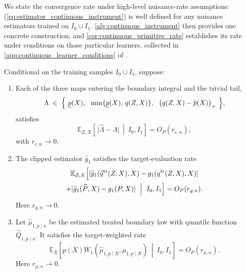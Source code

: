 We state the convergence rate under high-level nuisance-rate assumptions: (\ref{eq:estimator_continuous_instrument}) is well defined for any nuisance estimators trained on $I_0\cup I_1$. \cref{alg:continuous_instrument} then provides one concrete construction, and \cref{cor:continuous_primitive_rate} establishes its rate under conditions on those particular learners, collected in \cref{app:continuous_learner_conditions} of \oalocation.
\begin{assumption}\label{asp:continuous_rates}
    Conditional on the training samples $I_0\cup I_1$, suppose:
    \begin{enumerate}
        \item Each of the three maps entering the boundary integral and the trivial tail,
        \begin{equation*}
            \Lambda \;\in\; \Bigl\{\ \underline{p}(X),\ \ \min\{\underline{p}(X),\,q(Z,X)\},\ \ \bigl(q(Z,X)-\overline{p}(X)\bigr)_+ \ \Bigr\},
        \end{equation*}
        satisfies
        \[
            \mathbb E_{Z,X}\!\left[\,\bigl|\hat\Lambda-\Lambda\bigr|\ \middle|\ I_0,I_1\right]=O_P(r_{e,n}),
        \]
        with $r_{e,n}\to0$.
        \item The clipped estimator $\hat g_1$ satisfies the target-evaluation rate
        \begin{multline*}
            \mathbb E_{Z,X}\Bigl[
              |\hat g_1(\hat q^{\mathrm{tr}}(Z,X),X)-g_1(q^{\mathrm{tr}}(Z,X),X)| \\
              +|\hat g_1(\hat P,X)-g_1(P,X)|
              \ \Bigm|\ I_0,I_1\Bigr]=O_P(r_{g,n}).
        \end{multline*}
        Here $r_{g,n}\to0$.
        \item Let $\hat\mu_{1,\underline p\mid x}$ be the estimated treated boundary law with quantile function $\widehat Q_{1,\underline p\mid x}$. It satisfies the target-weighted rate
        \[
            \mathbb E_X\!\left[\underline{p}(X)W_1\!\left(\hat\mu_{1,\underline p\mid X},\mu_{1,\underline p\mid X}\right)\ \middle|\ I_0,I_1\right]=O_P(r_{\mu,n}).
        \]
        Here $r_{\mu,n}\to0$.
    \end{enumerate}
\end{assumption}

